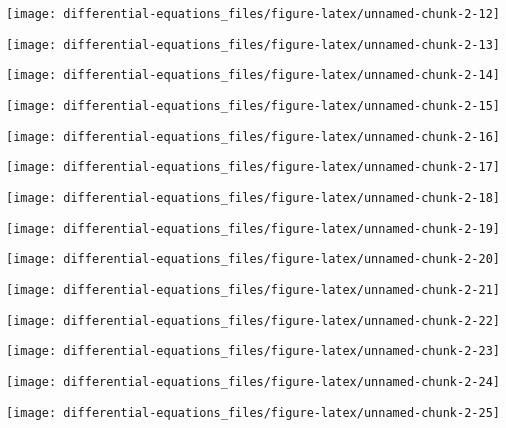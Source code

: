 \documentclass[]{tufte-handout}
\begin{document}
\begin{marginfigure}
\texttt{[image: differential-equations\_files/figure-latex/unnamed-chunk-2-12]} \end{marginfigure}
\begin{marginfigure}
\texttt{[image: differential-equations\_files/figure-latex/unnamed-chunk-2-13]} \end{marginfigure}
\begin{marginfigure}
\texttt{[image: differential-equations\_files/figure-latex/unnamed-chunk-2-14]} \end{marginfigure}
\begin{marginfigure}
\texttt{[image: differential-equations\_files/figure-latex/unnamed-chunk-2-15]} \end{marginfigure}
\begin{marginfigure}
\texttt{[image: differential-equations\_files/figure-latex/unnamed-chunk-2-16]} \end{marginfigure}
\begin{marginfigure}
\texttt{[image: differential-equations\_files/figure-latex/unnamed-chunk-2-17]} \end{marginfigure}
\begin{marginfigure}
\texttt{[image: differential-equations\_files/figure-latex/unnamed-chunk-2-18]} \end{marginfigure}
\begin{marginfigure}
\texttt{[image: differential-equations\_files/figure-latex/unnamed-chunk-2-19]} \end{marginfigure}
\begin{marginfigure}
\texttt{[image: differential-equations\_files/figure-latex/unnamed-chunk-2-20]} \end{marginfigure}
\begin{marginfigure}
\texttt{[image: differential-equations\_files/figure-latex/unnamed-chunk-2-21]} \end{marginfigure}
\begin{marginfigure}
\texttt{[image: differential-equations\_files/figure-latex/unnamed-chunk-2-22]} \end{marginfigure}
\begin{marginfigure}
\texttt{[image: differential-equations\_files/figure-latex/unnamed-chunk-2-23]} \end{marginfigure}
\begin{marginfigure}
\texttt{[image: differential-equations\_files/figure-latex/unnamed-chunk-2-24]} \end{marginfigure}
\begin{marginfigure}
\texttt{[image: differential-equations\_files/figure-latex/unnamed-chunk-2-25]} \end{marginfigure}
\end{document}
